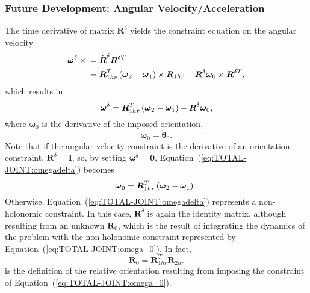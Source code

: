 \documentclass[10pt,dvips,fleqn,subeqn]{report}
\newcommand{\T}[1]{\boldsymbol{#1}}
\begin{document}
\subsubsection{Future Development: Angular Velocity/Acceleration}
The time derivative of matrix $\T{R}^{\delta}$ yields
the constraint equation on the angular velocity
\begin{align}
	\T{\omega}^{\delta}\times{}
	&= \dot{\T{R}}^{\delta} \T{R}^{\delta T} \nonumber \\
	&= \T{R}_{1hr}^T \plbr{
		\T{\omega}_2 - \T{\omega}_1
	} \times \T{R}_{1hr}
	- \T{R}^{\delta} \T{\omega}_0 \times \T{R}^{\delta T},
\end{align}
which results in
\begin{equation}
	\T{\omega}^{\delta} = \T{R}_{1hr}^T \plbr{
		\T{\omega}_2 - \T{\omega}_1
	} - \T{R}^{\delta} \T{\omega}_0 ,
	\label{eq:TOTAL-JOINT:omegadelta}
\end{equation}
where $\T{\omega}_0$ is the derivative of the imposed orientation,
\begin{equation}
	\T{\omega}_0 = \dot{\T{\theta}}_0 .
\end{equation}
Note that if the angular velocity constraint 
is the derivative of an orientation constraint, $\T{R}^{\delta}=\T{I}$,
so, by setting $\T{\omega}^{\delta}=\T{0}$,
Equation~(\ref{eq:TOTAL-JOINT:omegadelta}) becomes
\begin{equation}
	\T{\omega}_0 = \T{R}_{1hr}^T \plbr{
		\T{\omega}_2 - \T{\omega}_1
	} .
	\label{eq:TOTAL-JOINT:omega_0}
\end{equation}
Otherwise, Equation~(\ref{eq:TOTAL-JOINT:omegadelta}) represents
a non-holonomic constraint.
In this case, $\T{R}^{\delta}$ is again the identity matrix, although
resulting from an unknown $\T{R}_0$, which is the result of integrating
the dynamics of the problem with the non-holonomic constraint represented
by Equation~(\ref{eq:TOTAL-JOINT:omega_0}).
In fact,
\begin{equation}
	\T{R}_0 = \T{R}_{1hr}^T \T{R}_{2hr}
\end{equation}
is the definition of the relative orientation resulting from 
imposing the constraint of Equation~(\ref{eq:TOTAL-JOINT:omega_0}).
\end{document}
